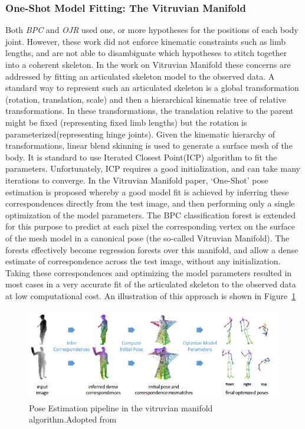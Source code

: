 \subsubsection{One-Shot Model Fitting: The Vitruvian Manifold}
	Both \emph{BPC} and \emph{OJR} used one, or more hypotheses for the positions of each body joint. However, these work did not enforce kinematic constraints such as limb lengths, and are not able to disambiguate which hypotheses to stitch together into a coherent skeleton. In the work on Vitruvian Manifold \cite{Sharp2012} these concerns are addressed by fitting an articulated skeleton model to the observed data. A standard way to represent such an articulated skeleton is a global transformation (rotation, translation, scale) and then a hierarchical kinematic tree of relative transformations. In these transformations, the translation relative to the parent might be fixed (representing fixed limb lengths) but the rotation is parameterized(representing hinge joints). Given the kinematic hierarchy of transformations, linear blend skinning is used to generate a surface mesh of the body. It is standard to use Iterated Closest Point(ICP) algorithm to fit the parameters. Unfortunately, ICP requires a good initialization, and can take many iterations to converge. In the Vitruvian Manifold paper\cite{Sharp2012}, ‘One-Shot’ pose estimation is proposed whereby a good model fit is achieved by inferring these correspondences directly from the test image, and then performing only a single optimization of the model parameters. The BPC classification forest is extended for this purpose to predict at each pixel the corresponding vertex on the surface of the mesh model in a canonical pose (the so-called Vitruvian Manifold). The forests effectively become regression forests over this manifold, and allow a dense estimate of correspondence across the test image, without any initialization. Taking these correspondences and optimizing the model parameters resulted in most cases in a very accurate fit of the articulated skeleton to the observed data at low computational cost. An illustration of this approach is shown in Figure~\ref{fig:vitruvian}

\begin{figure}[H]
\centering
\includegraphics[width=\textwidth]{assets/vitruvian_manifold.png}
\caption[Pose Estimation pipeline in the vitruvian manifold algorithm]{Pose Estimation pipeline in the vitruvian manifold algorithm.{Adopted from \cite{Sharp2012}}}
\label{fig:vitruvian}
\end{figure}

